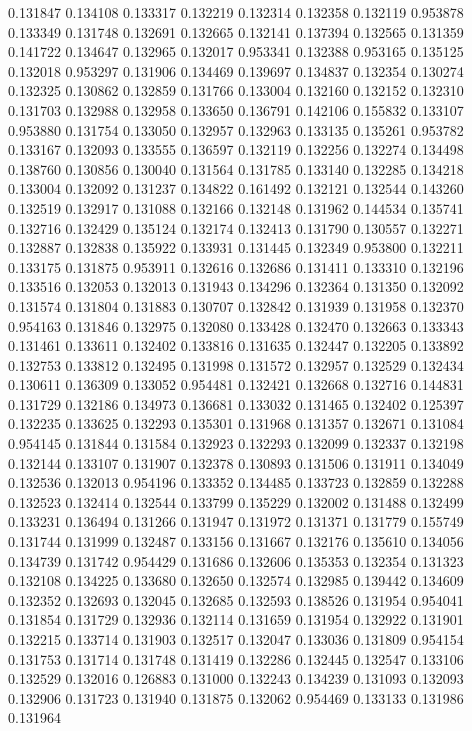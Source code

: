 0.131847
0.134108
0.133317
0.132219
0.132314
0.132358
0.132119
0.953878
0.133349
0.131748
0.132691
0.132665
0.132141
0.137394
0.132565
0.131359
0.141722
0.134647
0.132965
0.132017
0.953341
0.132388
0.953165
0.135125
0.132018
0.953297
0.131906
0.134469
0.139697
0.134837
0.132354
0.130274
0.132325
0.130862
0.132859
0.131766
0.133004
0.132160
0.132152
0.132310
0.131703
0.132988
0.132958
0.133650
0.136791
0.142106
0.155832
0.133107
0.953880
0.131754
0.133050
0.132957
0.132963
0.133135
0.135261
0.953782
0.133167
0.132093
0.133555
0.136597
0.132119
0.132256
0.132274
0.134498
0.138760
0.130856
0.130040
0.131564
0.131785
0.133140
0.132285
0.134218
0.133004
0.132092
0.131237
0.134822
0.161492
0.132121
0.132544
0.143260
0.132519
0.132917
0.131088
0.132166
0.132148
0.131962
0.144534
0.135741
0.132716
0.132429
0.135124
0.132174
0.132413
0.131790
0.130557
0.132271
0.132887
0.132838
0.135922
0.133931
0.131445
0.132349
0.953800
0.132211
0.133175
0.131875
0.953911
0.132616
0.132686
0.131411
0.133310
0.132196
0.133516
0.132053
0.132013
0.131943
0.134296
0.132364
0.131350
0.132092
0.131574
0.131804
0.131883
0.130707
0.132842
0.131939
0.131958
0.132370
0.954163
0.131846
0.132975
0.132080
0.133428
0.132470
0.132663
0.133343
0.131461
0.133611
0.132402
0.133816
0.131635
0.132447
0.132205
0.133892
0.132753
0.133812
0.132495
0.131998
0.131572
0.132957
0.132529
0.132434
0.130611
0.136309
0.133052
0.954481
0.132421
0.132668
0.132716
0.144831
0.131729
0.132186
0.134973
0.136681
0.133032
0.131465
0.132402
0.125397
0.132235
0.133625
0.132293
0.135301
0.131968
0.131357
0.132671
0.131084
0.954145
0.131844
0.131584
0.132923
0.132293
0.132099
0.132337
0.132198
0.132144
0.133107
0.131907
0.132378
0.130893
0.131506
0.131911
0.134049
0.132536
0.132013
0.954196
0.133352
0.134485
0.133723
0.132859
0.132288
0.132523
0.132414
0.132544
0.133799
0.135229
0.132002
0.131488
0.132499
0.133231
0.136494
0.131266
0.131947
0.131972
0.131371
0.131779
0.155749
0.131744
0.131999
0.132487
0.133156
0.131667
0.132176
0.135610
0.134056
0.134739
0.131742
0.954429
0.131686
0.132606
0.135353
0.132354
0.131323
0.132108
0.134225
0.133680
0.132650
0.132574
0.132985
0.139442
0.134609
0.132352
0.132693
0.132045
0.132685
0.132593
0.138526
0.131954
0.954041
0.131854
0.131729
0.132936
0.132114
0.131659
0.131954
0.132922
0.131901
0.132215
0.133714
0.131903
0.132517
0.132047
0.133036
0.131809
0.954154
0.131753
0.131714
0.131748
0.131419
0.132286
0.132445
0.132547
0.133106
0.132529
0.132016
0.126883
0.131000
0.132243
0.134239
0.131093
0.132093
0.132906
0.131723
0.131940
0.131875
0.132062
0.954469
0.133133
0.131986
0.131964
